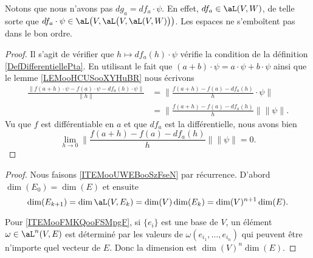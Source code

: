 Notons que nous n'avons pas \( dg_a=df_a\cdot \psi\). En effet, \( df_a\in \aL( V,W )\), de telle sorte que \( df_a\cdot\psi\in \aL\big( V,\aL\big( V,\aL(V,W) \big) \big)\). Les espaces ne s'emboîtent pas dans le bon ordre.

\begin{proof}
	Il s'agit de vérifier que \( h\mapsto df_a(h)\cdot \psi\) vérifie la condition de la définition \ref{DefDifferentiellePta}. En utilisant le fait que \( (a+b)\cdot \psi = a\cdot \psi+b\cdot \psi\) ainsi que le lemme \ref{LEMooHCUSooXYHuBR} nous écrivons
	\begin{subequations}
		\begin{align}
			\frac{ \| f(a+h)\cdot \psi-f(a)\cdot\psi-df_a(h)\cdot \psi\|  }{ \| h \| } & =\| \frac{ f(a+h)-f(a)-df_a(h) }{ h  }\cdot \psi\|  \\
			                                                                           & =\| \frac{ f(a+h)-f(a)-df_a(h) }{ h } \|\| \psi \|.
		\end{align}
	\end{subequations}
	Vu que \( f\) est différentiable en \( a\) et que \( df_a\) est la différentielle, nous avons bien
	\begin{equation}
		\lim_{h\to 0}  \| \frac{ f(a+h)-f(a)-df_a(h) }{ h } \|\| \psi \|=0.
	\end{equation}
\end{proof}


\begin{proof}
	Nous faisons \ref{ITEMooUWEBooSzFseN} par récurrence. D'abord \( \dim(E_0)=\dim(E)\) et ensuite
	\begin{equation}
		\dim(E_{k+1})=\dim\aL(V,E_k)=\dim(V)\dim(E_k)=\dim(V)^{n+1}\dim(E).
	\end{equation}

	Pour \ref{ITEMooFMKQooFSMpgF}, si \( \{ e_i \}\) est une base de \( V\), un élément \( \omega\in \aL^n(V,E)\) est déterminé par les valeurs de \( \omega(e_{i_1},\ldots, e_{i_n})\) qui peuvent être n'importe quel vecteur de \( E\). Donc la dimension est \( \dim(V)^n\dim(E)\).
\end{proof}

